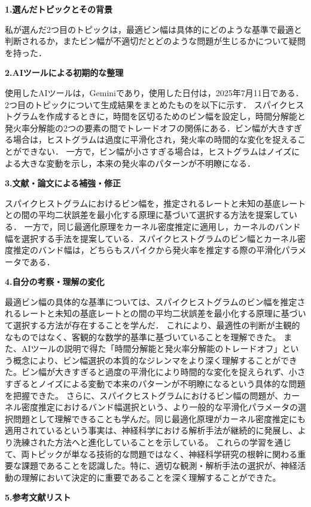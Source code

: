 \documentclass{classes/report}
\begin{document}
\newpage

\textbf{\large 1.選んだトピックとその背景}

私が選んだ2つ目のトピックは，最適ビン幅は具体的にどのような基準で最適と判断されるか，またビン幅が不適切だとどのような問題が生じるかについて疑問を持った．

\textbf{\large 2.AIツールによる初期的な整理}

使用したAIツールは，Geminiであり，使用した日付は，2025年7月11日である．2つ目のトピックについて生成結果をまとめたものを以下に示す．
スパイクヒストグラムを作成するときに，時間を区切るためのビン幅を設定し，時間分解能と発火率分解能の2つの要素の間でトレードオフの関係にある．ビン幅が大きすぎる場合は，ヒストグラムは過度に平滑化され，発火率の時間的な変化を捉えることができない．
一方で，ビン幅が小さすぎる場合は，ヒストグラムはノイズによる大きな変動を示し，本来の発火率のパターンが不明瞭になる．

\textbf{\large 3.文献・論文による補強・修正}

スパイクヒストグラムにおけるビン幅を，推定されるレートと未知の基底レートとの間の平均二状誤差を最小化する原理に基づいて選択する方法を提案している\cite{10.1162/neco.2007.19.6.1503}．
一方で，同じ最適化原理をカーネル密度推定に適用し，カーネルのバンド幅を選択する手法\cite{Shimazaki2010}を提案している．スパイクヒストグラムのビン幅とカーネル密度推定のバンド幅は，どちらもスパイクから発火率を推定する際の平滑化パラメータである．


\textbf{\large 4.自分の考察・理解の変化}

最適ビン幅の具体的な基準については、スパイクヒストグラムのビン幅を推定されるレートと未知の基底レートとの間の平均二状誤差を最小化する原理に基づいて選択する方法が存在することを学んだ．
これにより、最適性の判断が主観的なものではなく、客観的な数学的基準に基づいていることを理解できた。
また、AIツールの説明で得た「時間分解能と発火率分解能のトレードオフ」という概念により、ビン幅選択の本質的なジレンマをより深く理解することができた。ビン幅が大きすぎると過度の平滑化により時間的な変化を捉えられず、小さすぎるとノイズによる変動で本来のパターンが不明瞭になるという具体的な問題を把握できた。
さらに、スパイクヒストグラムにおけるビン幅の問題が、カーネル密度推定におけるバンド幅選択という、より一般的な平滑化パラメータの選択問題として理解できることも学んだ。同じ最適化原理がカーネル密度推定にも適用されているという事実は、神経科学における解析手法が継続的に発展し、より洗練された方法へと進化していることを示している。
これらの学習を通じて、両トピックが単なる技術的な問題ではなく、神経科学研究の根幹に関わる重要な課題であることを認識した。特に、適切な観測・解析手法の選択が、神経活動の理解において決定的に重要であることを深く理解することができた。

\textbf{\large 5.参考文献リスト}

\printbibliography[heading=none]
\end{document}
